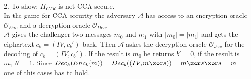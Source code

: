 \\
2. To show: \(\Pi_{CTR}\) is not CCA-secure.\\
In the game for CCA-security the adversary \(\mathcal{A}\) has access to an encryption oracle \(\mathcal{O}_{Enc}\) and a decryption oracle \(\mathcal{O}_{Dec}\). \\
\(\mathcal{A}\) gives the challenger two messages \(m_0\) and \(m_1\) with \(\vert m_0 \vert = \vert m_1 \vert\) and gets the ciphertext \(c_b = (IV, c_b')\) back. Then \(\mathcal{A}\) askes the decryption oracle \(\mathcal{O}_{Dec}\) for the decoding of \(c_b = (IV, c_b')\). If the result is \(m_0\) he returns \(b' = 0\), if the result is \(m_1\) \(b' = 1\). Since \(Dec_k(Enc_k(m) )= Dec_k((IV, m \xor s)) = m \xor s \xor s = m\) one of this cases has to hold. 

